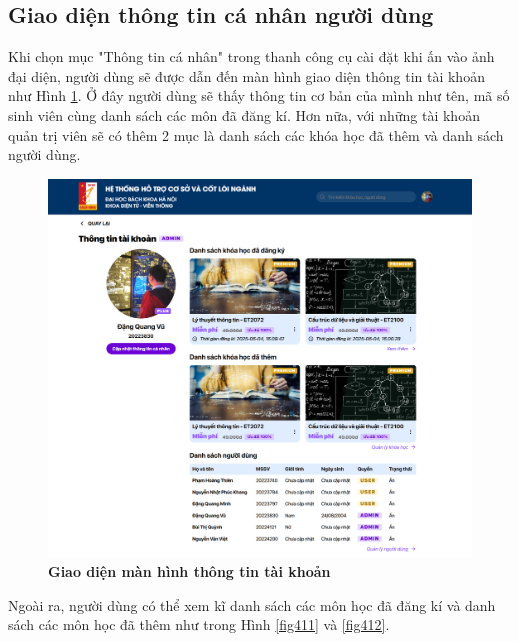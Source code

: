 \documentclass{article}
\begin{document}
	 \subsection{Giao diện thông tin cá nhân người dùng}
	 
	 Khi chọn mục "Thông tin cá nhân" trong thanh công cụ cài đặt khi ấn vào ảnh đại diện, người dùng sẽ được dẫn đến màn hình giao diện thông tin tài khoản như Hình \ref{fig410}. Ở đây người dùng sẽ thấy thông tin cơ bản của mình như tên, mã số sinh viên cùng danh sách các môn đã đăng kí. Hơn nữa, với những tài khoản quản trị viên sẽ có thêm 2 mục là danh sách các khóa học đã thêm và danh sách người dùng.
	 
	 \begin{figure}[!ht]
	 	\centering
	 	\includegraphics[trim= 10pt 10pt 10pt 10pt, clip, width=14cm]{localhost_3000_profile.png}
	 	\caption [Giao diện màn hình thông tin tài khoản]{\bfseries \fontsize{12pt}{0pt}\selectfont Giao diện màn hình thông tin tài khoản}
	 	\label{fig410}
	 \end{figure}
	 
	 Ngoài ra, người dùng có thể xem kĩ danh sách các môn học đã đăng kí và danh sách các môn học đã thêm như trong Hình \ref{fig411} và \ref{fig412}.
	 
\end{document}
